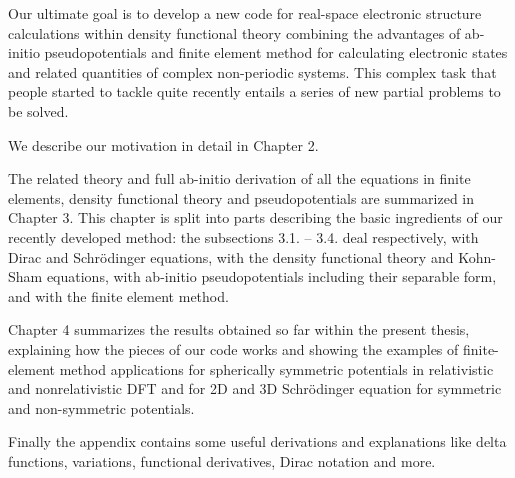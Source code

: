 Our ultimate goal is to develop a new code for real-space electronic structure
calculations within density functional theory combining the advantages
of ab-initio pseudopotentials and finite element method for calculating
electronic states and related quantities of complex non-periodic systems.
This complex task that people started to tackle quite recently
\cite{pask1, pask2, ortiz1, ortiz2}
entails a series of new partial problems to be solved.

We describe our motivation in detail in Chapter 2.

The related theory and full ab-initio derivation of all the equations
in finite elements, density functional theory and pseudopotentials
are summarized in Chapter 3.
This chapter is split into parts describing the basic ingredients of our
recently developed method: the subsections 3.1. -- 3.4. deal respectively,
with Dirac and Schr\"odinger equations, with the density functional theory and
Kohn-Sham equations, with ab-initio pseudopotentials including their separable
form, and with the finite element method.


Chapter 4 summarizes the results obtained so far within the
present thesis, explaining how the pieces of our code works and showing
the examples of finite-element method applications for spherically symmetric
potentials in relativistic and nonrelativistic DFT and for 2D and 3D
Schr\"odinger equation for symmetric and non-symmetric potentials.

Finally the appendix contains some useful derivations and explanations like
delta functions, variations, functional derivatives, Dirac notation and more.
